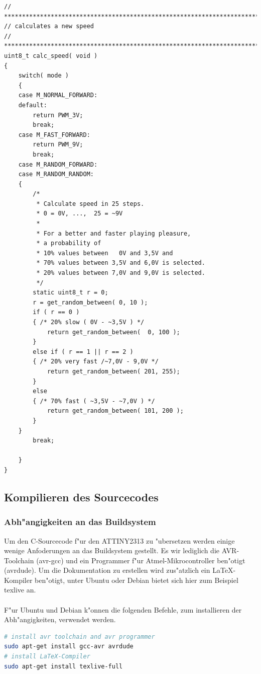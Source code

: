 \vspace{0.5cm}
\begin{lstlisting}[caption={Calculate Speed},label=lst:calcspeed]
// ****************************************************************************
// calculates a new speed
// ***************************************************************************/
uint8_t calc_speed( void )
{
	switch( mode )
	{
	case M_NORMAL_FORWARD:
	default:
		return PWM_3V;
		break;
	case M_FAST_FORWARD:
		return PWM_9V;
		break;
	case M_RANDOM_FORWARD:
	case M_RANDOM_RANDOM:
	{
		/*
		 * Calculate speed in 25 steps.
		 * 0 = 0V, ...,  25 = ~9V
		 *
		 * For a better and faster playing pleasure,
		 * a probability of
		 * 10% values between   0V and 3,5V and
		 * 70% values between 3,5V and 6,0V is selected.
		 * 20% values between 7,0V and 9,0V is selected.
		 */
		static uint8_t r = 0;
		r = get_random_between( 0, 10 );
		if ( r == 0 )
		{ /* 20% slow ( 0V - ~3,5V ) */
			return get_random_between(  0, 100 );
		}
		else if ( r == 1 || r == 2 )
		{ /* 20% very fast /~7,0V - 9,0V */
			return get_random_between( 201, 255);
		}
		else
		{ /* 70% fast ( ~3,5V - ~7,0V ) */
			return get_random_between( 101, 200 );
		}
	}
		break;

	}
}
\end{lstlisting}
\vspace{0.5cm}

\subsection{Kompilieren des Sourcecodes}
\subsubsection{Abh"angigkeiten an das Buildsystem}

Um den C-Sourcecode f"ur den ATTINY2313 zu "ubersetzen werden einige wenige Anfoderungen an das Buildsystem gestellt.
Es wir lediglich die AVR-Toolchain (avr-gcc) und ein Programmer f"ur Atmel-Mikrocontroller ben"otigt (avrdude).
Um die Dokumentation zu erstellen wird zus"atzlich ein LaTeX-Kompiler ben"otigt, unter Ubuntu oder Debian bietet sich hier zum Beispiel texlive an.\\
\\
F"ur Ubuntu und Debian k"onnen die folgenden Befehle, zum installieren der Abh"angigkeiten, verwendet werden.

\vspace{0.5cm}
\begin{lstlisting}[caption={Build dependencies},language=sh,label=lst:builddep]
# install avr toolchain and avr programmer
sudo apt-get install gcc-avr avrdude
# install LaTeX-Compiler
sudo apt-get install texlive-full
\end{lstlisting}
\vspace{0.5cm}

